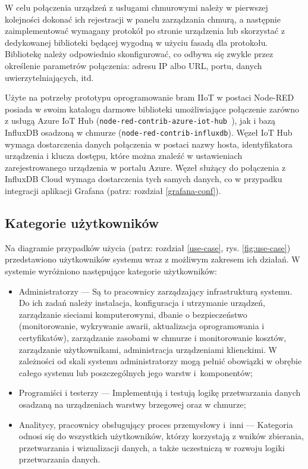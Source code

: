 \documentclass[a4paper, 12pt, twoside]{article}
\begin{document}
W celu połączenia urządzeń z usługami chmurowymi należy w pierwszej kolejności
dokonać ich rejestracji w panelu zarządzania chmurą, a następnie zaimplementować
wymagany protokół po stronie urządzenia lub skorzystać z dedykowanej biblioteki
będącej wygodną w użyciu fasadą dla protokołu. Bibliotekę należy odpowiednio
skonfigurować, co odbywa się zwykle przez określenie parametrów połączenia:
adresu IP albo URL, portu, danych uwierzytelniających, itd.

Użyte na potrzeby prototypu oprogramowanie bram IIoT w postaci Node-RED
posiada w swoim katalogu darmowe biblioteki umożliwiające połączenie zarówno z usługą
Azure IoT Hub (\texttt{node-red-contrib-azure-iot-hub }),
jak i bazą InfluxDB osadzoną w chmurze (\texttt{node-red-contrib-influxdb}).
Węzeł IoT Hub wymaga dostarczenia danych połączenia w postaci nazwy hosta,
identyfikatora urządzenia i klucza dostępu, które można znaleźć w ustawieniach
zarejestrowanego urządzenia w portalu Azure. Węzeł służący do połączenia z
InfluxDB Cloud wymaga dostarczenia tych samych danych, co w przypadku integracji
aplikacji Grafana (patrz: rozdział \ref{grafana-conf}).

\subsection{Kategorie użytkowników}

Na diagramie przypadków użycia (patrz: rozdział \ref{use-case}, rys. \ref{fig:use-case})
przedstawiono użytkowników systemu wraz z możliwym zakresem ich działań.
W systemie wyróżniono następujące kategorie użytkowników:
\begin{itemize}
      \itemsep0em
      \item Administratorzy --- Są to pracownicy zarządzający infrastrukturą systemu.
            Do ich zadań należy instalacja, konfiguracja i utrzymanie urządzeń,
            zarządzanie sieciami komputerowymi, dbanie o bezpieczeństwo (monitorowanie,
            wykrywanie awarii, aktualizacja oprogramowania i certyfikatów),  zarządzanie zasobami w chmurze
            i monitorowanie kosztów, zarządzanie użytkownikami, administracja urządzeniami klienckimi.
            W zależności od skali systemu administratorzy mogą pełnić obowiązki
            w obrębie całego systemu lub poszczególnych jego warstw i~komponentów;
      \item Programiści i testerzy --- Implementują i testują logikę przetwarzania
            danych osadzaną na urządzeniach warstwy brzegowej oraz w chmurze;
      \item Analitycy, pracownicy obsługujący proces przemysłowy i~inni ---
            Kategoria odnosi się do wszystkich użytkowników, którzy korzystają z wników zbierania, przetwarzania
            i wizualizacji danych, a także uczestniczą w rozwoju logiki przetwarzania danych.
\end{itemize}
\end{document}
